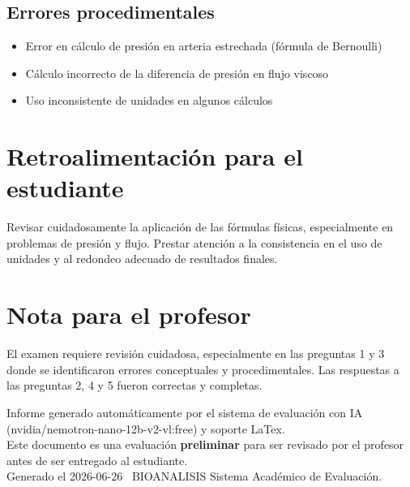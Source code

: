\documentclass[11pt,a4paper]{article}
\begin{document}
\subsection*{Errores procedimentales}
\begin{itemize}[leftmargin=1.5em, itemsep=2pt]
  \item Error en cálculo de presión en arteria estrechada (fórmula de Bernoulli)
  \item Cálculo incorrecto de la diferencia de presión en flujo viscoso
  \item Uso inconsistente de unidades en algunos cálculos
\end{itemize}

\section*{Retroalimentación para el estudiante}
\begin{tcolorbox}[cajaRecomendacion, title={Dirigido a: karla rodriguez 33628014}]
Revisar cuidadosamente la aplicación de las fórmulas físicas, especialmente en problemas de presión y flujo. Prestar atención a la consistencia en el uso de unidades y al redondeo adecuado de resultados finales.
\end{tcolorbox}

\section*{Nota para el profesor}
\begin{tcolorbox}[
  enhanced, breakable,
  colback=yellow!8, colframe=yellow!60!black,
  fonttitle=\bfseries, coltitle=black,
  title={Observaciones para revisión manual},
  top=4pt, bottom=4pt, left=8pt, right=8pt,
]
El examen requiere revisión cuidadosa, especialmente en las preguntas 1 y 3 donde se identificaron errores conceptuales y procedimentales. Las respuestas a las preguntas 2, 4 y 5 fueron correctas y completas.
\end{tcolorbox}

\vspace{12pt}
\begin{center}
  \footnotesize\color{gray}
  Informe generado automáticamente por el sistema de evaluación con IA (nvidia/nemotron-nano-12b-v2-vl:free) y soporte LaTex. \\
  Este documento es una evaluación \textbf{preliminar} para ser revisado por el profesor antes de ser entregado al 
  estudiante. \\
  Generado el 2026-06-26 \textbullet\ BIOANALISIS Sistema Académico de Evaluación.
  \end{center}
\end{document}

